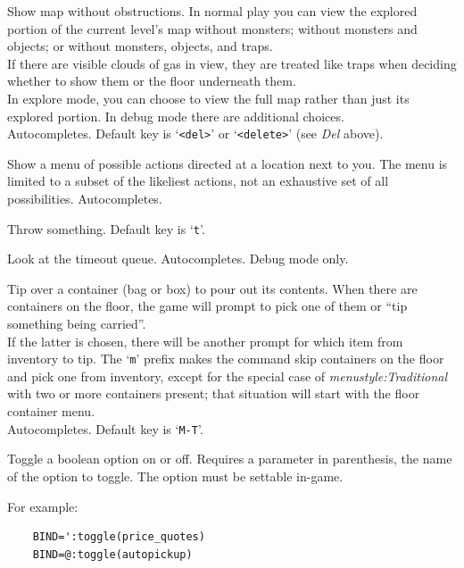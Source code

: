 \documentclass[titlepage]{article}
\begin{document}
\begin{description}[font=\mdseries\ttfamily]
Show map without obstructions.
In normal play you can view the explored portion of the current level's
map without monsters; without monsters and objects; or without monsters,
objects, and traps.\\
If there are visible clouds of gas in view, they are treated like traps
when deciding whether to show them or the floor underneath them.\\
In explore mode, you can choose to view the full map rather than just
its explored portion.
In debug mode there are additional choices.\\
Autocompletes.
Default key is `\texttt{<del>}' or `\texttt{<delete>}' (see \textit{Del} above).
\item[\#therecmdmenu]
Show a menu of possible actions directed at a location next to you.
The menu is limited to a subset of the likeliest actions, not an
exhaustive set of all possibilities.
Autocompletes.
\item[\#throw]
Throw something. Default key is `\texttt{t}'.
\item[\#timeout]
Look at the timeout queue.
Autocompletes.
Debug mode only.
\item[\#tip]
Tip over a container (bag or box) to pour out its contents.
When there are containers on the floor, the game will prompt to pick one
of them or ``tip something being carried''.
\\
If the latter is chosen, there will be another prompt for which item
from inventory to tip.
The `\texttt{m}' prefix makes the command skip containers on the
floor and pick one from inventory, except for the special case of
\textit{menustyle:Traditional}
with two or more containers present; that situation will start with the
floor container menu.
\\
Autocompletes. Default key is `\texttt{M-T}'.
\item[\#toggle]
Toggle a boolean option on or off.
Requires a parameter in parenthesis, the name of the option to toggle.
The option must be settable in-game.

For example:
\begin{verbatim}
    BIND=':toggle(price_quotes)
    BIND=@:toggle(autopickup)
\end{verbatim}


\end{description}
\end{document}

